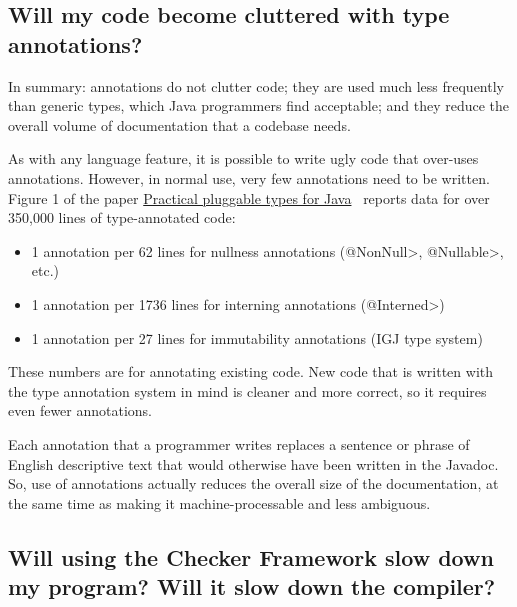 \subsection{Will my code become cluttered with type annotations?\label{faq-code-clutter}}


In summary:  annotations do not clutter code; they are used much
less frequently than generic types, which Java programmers find acceptable;
and they reduce the overall volume of documentation that a codebase needs.

As with any language feature, it is possible to write ugly code that
over-uses annotations.  However, in normal use, very few annotations need
to be written.  Figure 1 of the paper
\href{http://homes.cs.washington.edu/~mernst/pubs/pluggable-checkers-issta2008-abstract.html}{Practical
  pluggable types for Java}~\cite{PapiACPE2008} reports data for over
350,000 lines of type-annotated code:

\begin{itemize}
\item
    1 annotation per 62 lines for nullness annotations (\<@NonNull>, \<@Nullable>, etc.)
\item
    1 annotation per 1736 lines for interning annotations (\<@Interned>)
\item
    1 annotation per 27 lines for immutability annotations (IGJ type system)
\end{itemize}


These numbers are for annotating existing code.  New code that
is written with the type annotation system in mind is cleaner and more
correct, so it requires even fewer annotations.

Each annotation that a programmer writes replaces a sentence or phrase of
English descriptive text that would otherwise have been written in the
Javadoc.  So, use of annotations actually reduces the overall size of the
documentation, at the same time as making it machine-processable
and less ambiguous.


\subsection{Will using the Checker Framework slow down my program?  Will it slow down the compiler?\label{faq-slowdown}}

